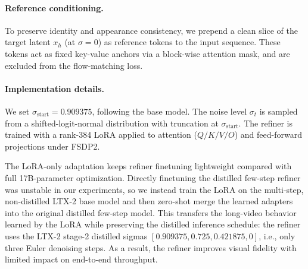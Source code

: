 \paragraph{Reference conditioning.}
To preserve identity and appearance consistency, we prepend a clean slice of
the target latent $x_h$ (at $\sigma=0$) as reference tokens to the input
sequence. These tokens act as fixed key-value anchors via a block-wise
attention mask, and are excluded from the flow-matching loss.

\paragraph{Implementation details.}
We set $\sigma_{\text{start}} = 0.909375$, following the base model. The
noise level $\sigma_t$ is sampled from a shifted-logit-normal distribution
with truncation at $\sigma_{\text{start}}$. The refiner is trained with a
rank-384 LoRA applied to attention ($Q/K/V/O$) and feed-forward projections
under FSDP2.

\noindent The LoRA-only adaptation keeps refiner finetuning lightweight compared with
full 17B-parameter optimization. Directly finetuning the distilled few-step
refiner was unstable in our experiments, so we instead train the LoRA on the
multi-step, non-distilled LTX-2 base model and then zero-shot merge the learned
adapters into the original distilled few-step model. This transfers the
long-video behavior learned by the LoRA while preserving the distilled
inference schedule: the refiner uses the LTX-2 stage-2 distilled
sigmas $[0.909375, 0.725, 0.421875, 0]$, i.e., only three Euler denoising
steps. As a result, the refiner improves visual fidelity with limited impact
on end-to-end throughput.


